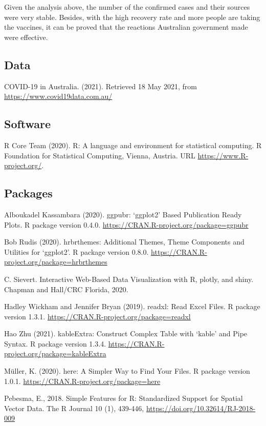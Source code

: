 \documentclass[11pt,a4paper,]{article}
\begin{document}
Given the analysis above, the number of the confirmed cases and their sources were very stable. Besides, with the high recovery rate and more people are taking the vaccines, it can be proved that the reactions Australian government made were effective.

\hypertarget{data}{%
\subsection{Data}\label{data}}

COVID-19 in Australia. (2021). Retrieved 18 May 2021, from \url{https://www.covid19data.com.au/}

\hypertarget{software}{%
\subsection{Software}\label{software}}

R Core Team (2020). R: A language and environment for statistical computing. R Foundation for Statistical Computing, Vienna, Austria. URL \url{https://www.R-project.org/}.

\hypertarget{packages}{%
\subsection{Packages}\label{packages}}

Alboukadel Kassambara (2020). ggpubr: `ggplot2' Based Publication Ready Plots. R package version 0.4.0. \url{https://CRAN.R-project.org/package=ggpubr}

Bob Rudis (2020). hrbrthemes: Additional Themes, Theme Components and Utilities for `ggplot2'. R package version 0.8.0. \url{https://CRAN.R-project.org/package=hrbrthemes}

C. Sievert. Interactive Web-Based Data Visualization with R, plotly, and shiny. Chapman and Hall/CRC Florida, 2020.

Hadley Wickham and Jennifer Bryan (2019). readxl: Read Excel Files. R package version 1.3.1. \url{https://CRAN.R-project.org/package=readxl}

Hao Zhu (2021). kableExtra: Construct Complex Table with `kable' and Pipe Syntax. R package version 1.3.4. \url{https://CRAN.R-project.org/package=kableExtra}

Müller, K. (2020). here: A Simpler Way to Find Your Files. R package version 1.0.1. \url{https://CRAN.R-project.org/package=here}

Pebesma, E., 2018. Simple Features for R: Standardized Support for Spatial Vector Data. The R Journal 10 (1), 439-446, \url{https://doi.org/10.32614/RJ-2018-009}
\end{document}
